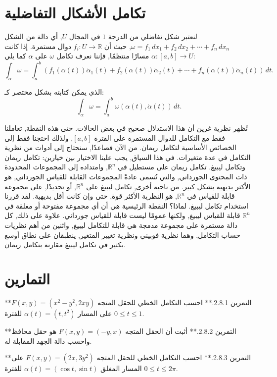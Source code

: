 
\section{تكامل الأشكال التفاضلية}

لنعتبر شكل تفاضلي من الدرجة \(1\) في المجال \(U\), أي دالة من الشكل \(\omega = f_1 \, dx_1 + f_2 \, dx_2 + \cdots + f_n \, dx_n\), حيث أن \(f_i : U \to \mathbb{R}\) دوال مستمرة. إذا كانت \(\alpha : [a, b] \to U\) مسارًا منتظمًا, فإننا نعرف تكامل \(\omega\) على \(\alpha\) كما يلي:
\[ \int_\alpha \omega = \int_a^b (f_1(\alpha(t)) \dot{\alpha}_1(t) + f_2(\alpha(t)) \dot{\alpha}_2(t) + \cdots + f_n(\alpha(t)) \dot{\alpha}_n(t)) \, dt. \]

الذي يمكن كتابته بشكل مختصر كـ:
\[ \int_\alpha \omega = \int_a^b \omega(\alpha(t), \dot{\alpha}(t)) \, dt. \]




تُظهر نظرية غرين أن هذا الاستدلال صحيح في بعض الحالات. حتى هذه النقطة, تعاملنا فقط مع التكامل للدوال المستمرة على الفترة \([a, b]\), ولذلك احتجنا فقط إلى الخصائص الأساسية لتكامل ريمان. من الآن فصاعدًا, سنحتاج إلى أدوات من نظرية التكامل في عدة متغيرات. في هذا السياق, يجب علينا الاختيار بين خيارين: تكامل ريمان وتكامل ليبيغ. تكامل ريمان على مستطيل في \(\mathbb{R}^n\), وامتداده إلى المجموعات المحدودة ذات المحتوى الجورداني, والتي تُسمى عادةً المجموعات القابلة للقياس الجورداني, هو الأكثر بديهية بشكل كبير. من ناحية أخرى, تكامل ليبيغ على \(\mathbb{R}^n\), أو تحديدًا, على مجموعة قابلة للقياس في \(\mathbb{R}^n\), هو النظرية الأكثر قوة, حتى وإن كانت أقل بديهية. لقد قررنا استخدام تكامل ليبيغ. لماذا؟ النقطة الرئيسية هي أن أي مجموعة مفتوحة أو مغلقة في \(\mathbb{R}^n\) قابلة للقياس ليبيغ, ولكنها عمومًا ليست قابلة للقياس جورداني. علاوة على ذلك, كل دالة مستمرة على مجموعة مدمجة هي قابلة للتكامل ليبيغ, واثنين من أهم نظريات حساب التكامل, وهما نظرية فوبيني ونظرية تغيير المتغير, ينطبقان على نطاق أوسع بكثير في تكامل ليبيغ مقارنة بتكامل ريمان.
\section{ التمارين}

**التمرين 2.8.1.** احسب التكامل الخطي للحقل المتجه \(F(x, y) = (x^2 - y^2, 2xy)\) على المسار \( \alpha(t) = (t, t^2) \) للفترة \(0 \leq t \leq 1\).

**التمرين 2.8.2.** أثبت أن الحقل المتجه \(F(x, y) = (-y, x)\) هو حقل محافظ واحسب دالة الجهد المقابلة له.

**التمرين 2.8.3.** احسب التكامل الخطي للحقل المتجه \(F(x, y) = (2x, 3y^2)\) على المسار المغلق \( \alpha(t) = (\cos t, \sin t) \) للفترة \(0 \leq t \leq 2\pi\).

